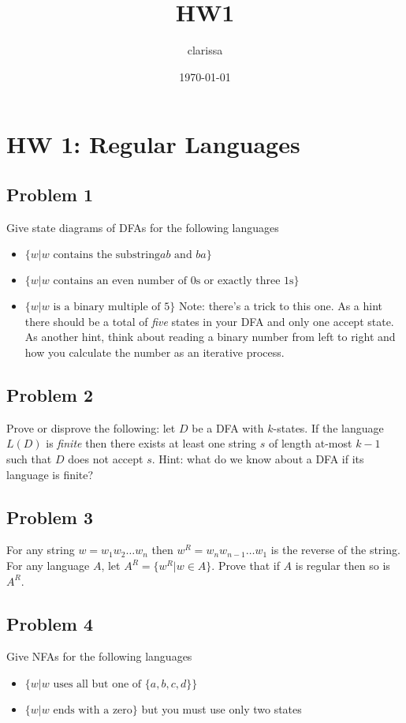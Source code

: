 \documentclass[11pt]{article}
\author{clarissa}
\date{\today}
\title{HW1}
\begin{document}
\maketitle
\tableofcontents

\section{HW 1: Regular Languages}
\label{sec-1}
\subsection{Problem 1}
\label{sec-1-1}
Give state diagrams of DFAs for the following languages
\begin{itemize}
\item $\{ w | w \text{ contains the substring} ab \text{ and } ba  \}$
\item $\{ w | w \text{ contains an even number of 0s or exactly three 1s} \}$
\item $\{ w | w \text{ is a binary multiple of 5} \}$ Note: there's a trick to this one. As a hint there should be a total of \emph{five} states in your DFA and only one accept state. As another hint, think about reading a binary number from left to right and how you calculate the number as an iterative process.
\end{itemize}
\subsection{Problem 2}
\label{sec-1-2}
Prove or disprove the following: let $D$ be a DFA with $k$-states. If the language $L(D)$ is \emph{finite} then there exists at least one string $s$ of length at-most $k-1$ such that $D$ does not accept  $s$. Hint: what do we know about a DFA if its language is finite?
\subsection{Problem 3}
\label{sec-1-3}
For any string $w=w_1 w_2 \ldots w_n$ then $w^R = w_n w_{n-1} \ldots w_1$ is the reverse of the string. For any language $A$, let $A^R = \{ w^R | w \in A \}$. Prove that if $A$ is regular then so is $A^R$. 
\subsection{Problem 4}
\label{sec-1-4}
Give NFAs for the following languages 
\begin{itemize}
\item $\{ w | w \text{ uses all but one of } \{a,b,c,d\} \}$
\item $\{ w | w \text{ ends with a zero} \}$ but you must use only two states
\end{itemize}
\end{document}
